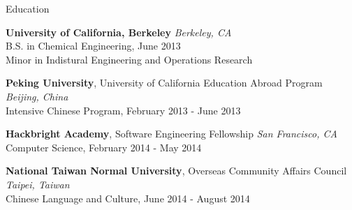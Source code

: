 \documentclass{resume} %
\begin{document}

\begin{rSection}{Education}

{\bf University of California, Berkeley} \hfill {\em Berkeley, CA} \\ 
B.S. in Chemical Engineering, June 2013 \\
Minor in Indistural Engineering and Operations Research \smallskip

{\bf Peking University}, University of California Education Abroad Program \hfill {\em Beijing, China} \\ 
Intensive Chinese Program, February 2013 - June 2013 \smallskip

{\bf Hackbright Academy}, Software Engineering Fellowship \hfill {\em San Francisco, CA} \\
Computer Science, February 2014 - May 2014 \smallskip

{\bf National Taiwan Normal University}, Overseas Community Affairs Council \hfill {\em Taipei, Taiwan} \\ 
Chinese Language and Culture, June 2014 - August 2014 \smallskip \\

\end{rSection}






\end{document}
